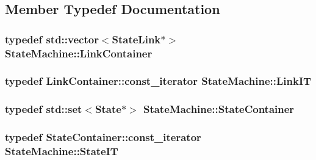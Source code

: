 \subsection{Member Typedef Documentation}
\subsubsection[{\texorpdfstring{Link\+Container}{LinkContainer}}]{\setlength{\rightskip}{0pt plus 5cm}typedef std\+::vector$<${\bf State\+Link}$\ast$$>$ {\bf State\+Machine\+::\+Link\+Container}}\hypertarget{classStateMachine_a48dd36fc36aca328a1d67f17a46bdbb1}{}\label{classStateMachine_a48dd36fc36aca328a1d67f17a46bdbb1}
\subsubsection[{\texorpdfstring{Link\+IT}{LinkIT}}]{\setlength{\rightskip}{0pt plus 5cm}typedef Link\+Container\+::const\+\_\+iterator {\bf State\+Machine\+::\+Link\+IT}}\hypertarget{classStateMachine_a918cb45a486130c0b513cfdbeed79fce}{}\label{classStateMachine_a918cb45a486130c0b513cfdbeed79fce}
\subsubsection[{\texorpdfstring{State\+Container}{StateContainer}}]{\setlength{\rightskip}{0pt plus 5cm}typedef std\+::set$<${\bf State}$\ast$$>$ {\bf State\+Machine\+::\+State\+Container}}\hypertarget{classStateMachine_aa74dc6c024af439e701f6d97cfa4c8b8}{}\label{classStateMachine_aa74dc6c024af439e701f6d97cfa4c8b8}
\subsubsection[{\texorpdfstring{State\+IT}{StateIT}}]{\setlength{\rightskip}{0pt plus 5cm}typedef State\+Container\+::const\+\_\+iterator {\bf State\+Machine\+::\+State\+IT}}\hypertarget{classStateMachine_ad01ce4c7148b88eee35e0598f0f3ce22}{}\label{classStateMachine_ad01ce4c7148b88eee35e0598f0f3ce22}


